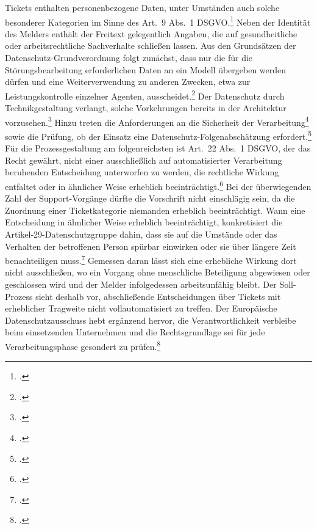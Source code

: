 Tickets enthalten personenbezogene Daten, unter Umst\"anden auch solche besonderer Kategorien im Sinne des Art.~9 Abs.~1 DSGVO.\footcite[Vgl.][Art.~9 Abs.~1]{DSGVO} Neben der Identit\"at des Melders enth\"alt der Freitext gelegentlich Angaben, die auf gesundheitliche oder arbeitsrechtliche Sachverhalte schlie{\ss}en lassen. Aus den Grunds\"atzen der Datenschutz-Grundverordnung folgt zun\"achst, dass nur die f\"ur die St\"orungsbearbeitung erforderlichen Daten an ein Modell \"ubergeben werden d\"urfen und eine Weiterverwendung zu anderen Zwecken, etwa zur Leistungskontrolle einzelner Agenten, ausscheidet.\footcite[Vgl.][Art.~5 Abs.~1 lit.~b und c]{DSGVO} Der Datenschutz durch Technikgestaltung verlangt, solche Vorkehrungen bereits in der Architektur vorzusehen.\footcite[Vgl.][Art.~25 Abs.~1]{DSGVO} Hinzu treten die Anforderungen an die Sicherheit der Verarbeitung\footcite[Vgl.][Art.~32]{DSGVO} sowie die Pr\"ufung, ob der Einsatz eine Datenschutz-Folgenabsch\"atzung erfordert.\footcite[Vgl.][Art.~35 Abs.~1]{DSGVO} F\"ur die Prozessgestaltung am folgenreichsten ist Art.~22 Abs.~1 DSGVO, der das Recht gew\"ahrt, nicht einer ausschlie{\ss}lich auf automatisierter Verarbeitung beruhenden Entscheidung unterworfen zu werden, die rechtliche Wirkung entfaltet oder in \"ahnlicher Weise erheblich beeintr\"achtigt.\footcite[Vgl.][Art.~22 Abs.~1]{DSGVO} Bei der \"uberwiegenden Zahl der Support-Vorg\"ange d\"urfte die Vorschrift nicht einschl\"agig sein, da die Zuordnung einer Ticketkategorie niemanden erheblich beeintr\"achtigt. Wann eine Entscheidung in \"ahnlicher Weise erheblich beeintr\"achtigt, konkretisiert die Artikel-29-Datenschutzgruppe dahin, dass sie auf die Umst\"ande oder das Verhalten der betroffenen Person sp\"urbar einwirken oder sie \"uber l\"angere Zeit benachteiligen muss.\footcite[Vgl.][S.~21]{WP29Leitlinien2018} Gemessen daran l\"asst sich eine erhebliche Wirkung dort nicht ausschlie{\ss}en, wo ein Vorgang ohne menschliche Beteiligung abgewiesen oder geschlossen wird und der Melder infolgedessen arbeitsunf\"ahig bleibt. Der Soll-Prozess sieht deshalb vor, abschlie{\ss}ende Entscheidungen \"uber Tickets mit erheblicher Tragweite nicht vollautomatisiert zu treffen. Der Europ\"aische Datenschutzausschuss hebt erg\"anzend hervor, die Verantwortlichkeit verbleibe beim einsetzenden Unternehmen und die Rechtsgrundlage sei f\"ur jede Verarbeitungsphase gesondert zu pr\"ufen.\footcite[Vgl.][S.~20]{EDSA2024}


